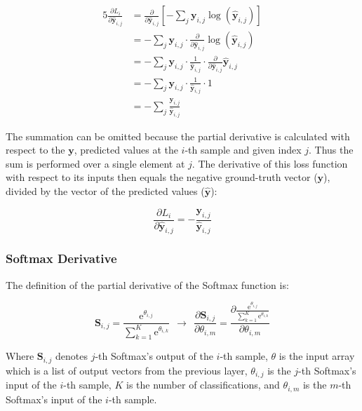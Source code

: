 \documentclass[a4paper]{article}
\newcommand{\euler}{\mathrm{e}}
\newcommand{\matr}[1]{\mathbf{#1}}
\newcommand{\vect}[1]{\bm{#1}}
\begin{document}
\begin{alignat*}{5}
    \frac{\partial L_i}{\partial \vect{\hat{y}}_{i,j}} &= \frac{\partial}{\partial \vect{\hat{y}}_{i,j}} [-\sum_j \vect{y}_{i,j} \log(\vect{\hat{y}}_{i,j})] \\
    &= -\sum_j \vect{y}_{i,j} \cdot \frac{\partial}{\partial \vect{\hat{y}}_{i,j}} \log(\vect{\hat{y}}_{i,j}) \\
    &= -\sum_j \vect{y}_{i,j} \cdot \frac{1}{\vect{\hat{y}}_{i,j}} \cdot \frac{\partial}{\partial \vect{\hat{y}}_{i,j}} \vect{\hat{y}}_{i,j} \\
    &= -\sum_j \vect{y}_{i,j} \cdot \frac{1}{\vect{\hat{y}}_{i,j}} \cdot 1 \\
    &= -\sum_j \frac{\vect{y}_{i,j}}{\vect{\hat{y}}_{i,j}}
\end{alignat*}

The summation can be omitted because the partial derivative is calculated with respect to the $\vect{y}$, predicted values at the $i$-th sample and given index $j$. Thus the sum is performed over a single element at $j$. The derivative of this loss function with respect to its inputs then equals the negative ground-truth vector ($\vect{y}$), divided by the vector of the predicted values ($\vect{\hat{y}}$):

\begin{equation*}
    \frac{\partial L_i}{\partial \vect{\hat{y}}_{i,j}} = -\frac{\vect{y}_{i,j}}{\vect{\hat{y}}_{i,j}}
\end{equation*}

\subsubsection*{Softmax Derivative}
The definition of the partial derivative of the Softmax function is:

\begin{equation*}
    \matr{S}_{i,j} = \frac{\euler^{\theta_{i,j}}}{\sum_{k=1}^K \euler^{\theta_{i,k}}} ~~ \rightarrow ~~ \frac{\partial \matr{S}_{i,j}}{\partial \theta_{i,m}} = \frac{\partial \frac{\euler^{\theta_{i,j}}}{\sum_{k=1}^{K} \euler^{\theta_{i,k}}}}{\partial \theta_{i,m}}
\end{equation*}

Where $\matr{S}_{i,j}$ denotes $j$-th Softmax's output of the $i$-th sample, $\theta$ is the input array which is a list of output vectors from the previous layer, $\theta_{i,j}$ is the $j$-th Softmax's input of the $i$-th sample, $K$ is the number of classifications, and $\theta_{i,m}$ is the $m$-th Softmax's input of the $i$-th sample.
\end{document}
